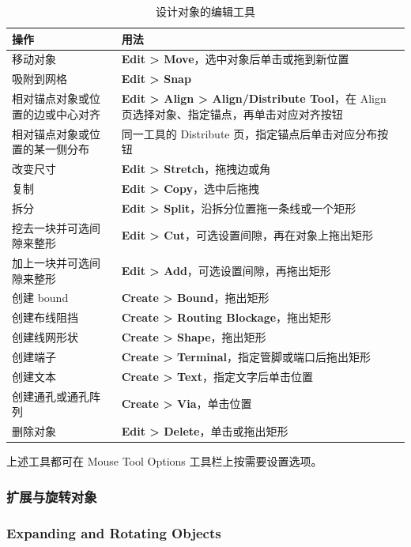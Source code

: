 \begin{table}[htbp]
\centering
\caption{设计对象的编辑工具}
\label{tab:gui-edit-tools}
\begin{tabularx}{\textwidth}{@{}l X@{}}
\toprule
操作 & 用法 \\
\midrule
移动对象 & \textbf{Edit > Move}，选中对象后单击或拖到新位置 \\
吸附到网格 & \textbf{Edit > Snap} \\
相对锚点对象或位置的边或中心对齐 &
\textbf{Edit > Align > Align/Distribute Tool}，在 Align 页选择对象、指定锚点，再单击对应对齐按钮 \\
相对锚点对象或位置的某一侧分布 &
同一工具的 Distribute 页，指定锚点后单击对应分布按钮 \\
改变尺寸 & \textbf{Edit > Stretch}，拖拽边或角 \\
复制 & \textbf{Edit > Copy}，选中后拖拽 \\
拆分 & \textbf{Edit > Split}，沿拆分位置拖一条线或一个矩形 \\
挖去一块并可选间隙来整形 &
\textbf{Edit > Cut}，可选设置间隙，再在对象上拖出矩形 \\
加上一块并可选间隙来整形 &
\textbf{Edit > Add}，可选设置间隙，再拖出矩形 \\
创建 bound & \textbf{Create > Bound}，拖出矩形 \\
创建布线阻挡 & \textbf{Create > Routing Blockage}，拖出矩形 \\
创建线网形状 & \textbf{Create > Shape}，拖出矩形 \\
创建端子 & \textbf{Create > Terminal}，指定管脚或端口后拖出矩形 \\
创建文本 & \textbf{Create > Text}，指定文字后单击位置 \\
创建通孔或通孔阵列 & \textbf{Create > Via}，单击位置 \\
删除对象 & \textbf{Edit > Delete}，单击或拖出矩形 \\
\bottomrule
\end{tabularx}
\end{table}

上述工具都可在 Mouse Tool Options 工具栏上按需要设置选项。

\subsubsection{扩展与旋转对象}
\subsubsection*{Expanding and Rotating Objects}


